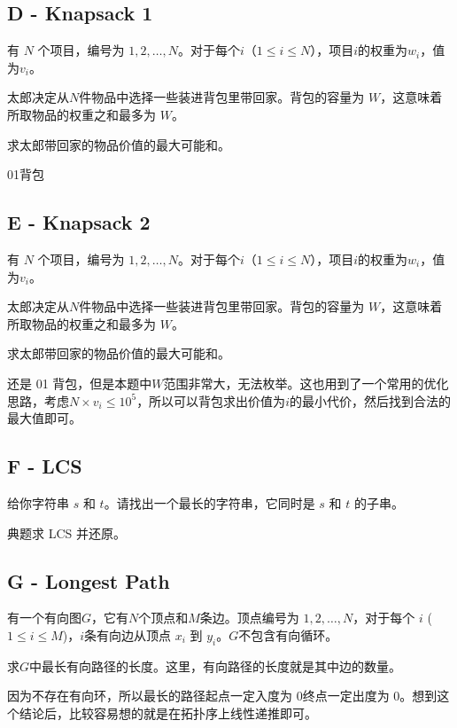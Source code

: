 \subsection{D - Knapsack 1}
\begin{framed}
    有 $N$ 个项目，编号为 $1, 2, \ldots, N$。对于每个$i$（$1 \leq i \leq N$），项目$i$的权重为$w_i$，值为$v_i$。

    太郎决定从$N$件物品中选择一些装进背包里带回家。背包的容量为 $W$，这意味着所取物品的权重之和最多为 $W$。

    求太郎带回家的物品价值的最大可能和。
\end{framed}
01背包



\subsection{E - Knapsack 2}
\begin{framed}
    有 $N$ 个项目，编号为 $1, 2, \ldots, N$。对于每个$i$（$1 \leq i \leq N$），项目$i$的权重为$w_i$，值为$v_i$。

    太郎决定从$N$件物品中选择一些装进背包里带回家。背包的容量为 $W$，这意味着所取物品的权重之和最多为 $W$。

    求太郎带回家的物品价值的最大可能和。
\end{framed}
还是 01 背包，但是本题中$W$范围非常大，无法枚举。这也用到了一个常用的优化思路，考虑$N\times v_i\le 10^5$，所以可以背包求出价值为$i$的最小代价，然后找到合法的最大值即可。



\subsection{F - LCS}
\begin{framed}
    给你字符串 $s$ 和 $t$。请找出一个最长的字符串，它同时是 $s$ 和 $t$ 的子串。
\end{framed}
典题求 LCS 并还原。


\subsection{G - Longest Path}
\begin{framed}
    有一个有向图$G$，它有$N$个顶点和$M$条边。顶点编号为 $1, 2, \ldots, N$，对于每个 $i$ ($1 \leq i \leq M$)，$i$条有向边从顶点 $x_i$ 到 $y_i$。$G$不包含有向循环。

    求$G$中最长有向路径的长度。这里，有向路径的长度就是其中边的数量。
\end{framed}
因为不存在有向环，所以最长的路径起点一定入度为 0终点一定出度为 0。想到这个结论后，比较容易想的就是在拓扑序上线性递推即可。


